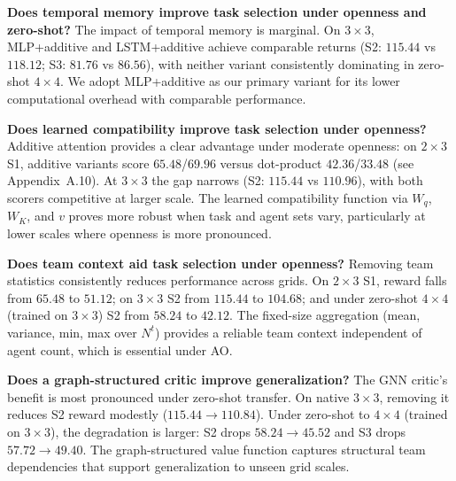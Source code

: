\begin{table}
\caption{PLATO ablations: episode return (mean $\pm$ std) on $3\times 3$ and zero-shot episode return on $4\times 4$ (mean $\pm$ std) when trained on $3\times 3$. Bold indicates statistically significant best performance within each setup (one-sided paired $t$-test; $\alpha\approx0.0083$).}
\label{tab:ablate_reward_stacked_3x3_4x4}
\end{table}






\textbf{Does temporal memory improve task selection under openness and zero-shot?} The impact of temporal memory is marginal. On $3\times 3$, MLP+additive and LSTM+additive achieve comparable returns (S2: $115.44$ vs $118.12$; S3: $81.76$ vs $86.56$), with neither variant consistently dominating in zero-shot $4\times 4$. We adopt MLP+additive as our primary variant for its lower computational overhead with comparable performance.

\textbf{Does learned compatibility improve task selection under openness?} Additive attention provides a clear advantage under moderate openness: on $2\times 3$ S1, additive variants score $65.48$/$69.96$ versus dot-product $42.36$/$33.48$ (see Appendix~A.10). At $3\times 3$ the gap narrows (S2: $115.44$ vs $110.96$), with both scorers competitive at larger scale. The learned compatibility function via $W_q$, $W_K$, and $v$ proves more robust when task and agent sets vary, particularly at lower scales where openness is more pronounced.

\textbf{Does team context aid task selection under openness?} Removing team statistics consistently reduces performance across grids. On $2\times 3$ S1, reward falls from $65.48$ to $51.12$; on $3\times 3$ S2 from $115.44$ to $104.68$; and under zero-shot $4\times 4$ (trained on $3\times 3$) S2 from $58.24$ to $42.12$. The fixed-size aggregation (mean, variance, min, max over $N^t$) provides a reliable team context independent of agent count, which is essential under AO.

\textbf{Does a graph-structured critic improve generalization?} The GNN critic's benefit is most pronounced under zero-shot transfer. On native $3\times 3$, removing it reduces S2 reward modestly ($115.44 \to 110.84$). Under zero-shot to $4\times 4$ (trained on $3\times 3$), the degradation is larger: S2 drops $58.24 \to 45.52$ and S3 drops $57.72 \to 49.40$. The graph-structured value function captures structural team dependencies that support generalization to unseen grid scales.


